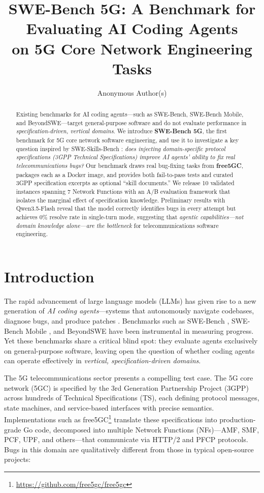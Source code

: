 \documentclass{article}
\title{SWE-Bench 5G: A Benchmark for Evaluating AI Coding Agents \\on 5G Core Network Engineering Tasks}
\author{
  Anonymous Author(s)
}
\begin{document}
\maketitle

\begin{abstract}
Existing benchmarks for AI coding agents---such as SWE-Bench, SWE-Bench Mobile, and BeyondSWE---target general-purpose software and do not evaluate performance in \emph{specification-driven, vertical domains}. We introduce \textbf{SWE-Bench 5G}, the first benchmark for 5G core network software engineering, and use it to investigate a key question inspired by SWE-Skills-Bench \citep{han2025sweskills}: \emph{does injecting domain-specific protocol specifications (3GPP Technical Specifications) improve AI agents' ability to fix real telecommunications bugs?} Our benchmark draws real bug-fixing tasks from \textbf{free5GC}, packages each as a Docker image, and provides both fail-to-pass tests and curated 3GPP specification excerpts as optional ``skill documents.'' We release 10 validated instances spanning 7 Network Functions with an A/B evaluation framework that isolates the marginal effect of specification knowledge. Preliminary results with Qwen3.5-Flash reveal that the model correctly identifies bugs in every attempt but achieves 0\% resolve rate in single-turn mode, suggesting that \emph{agentic capabilities---not domain knowledge alone---are the bottleneck} for telecommunications software engineering.
\end{abstract}

\section{Introduction}

The rapid advancement of large language models (LLMs) has given rise to a new generation of \emph{AI coding agents}---systems that autonomously navigate codebases, diagnose bugs, and produce patches \citep{jimenez2024swebench}. Benchmarks such as SWE-Bench \citep{jimenez2024swebench}, SWE-Bench Mobile \citep{yao2025swebenchmobile}, and BeyondSWE \citep{shi2025beyondswe} have been instrumental in measuring progress. Yet these benchmarks share a critical blind spot: they evaluate agents exclusively on general-purpose software, leaving open the question of whether coding agents can operate effectively in \emph{vertical, specification-driven domains}.

The 5G telecommunications sector presents a compelling test case. The 5G core network (5GC) is specified by the 3rd Generation Partnership Project (3GPP) across hundreds of Technical Specifications (TS), each defining protocol messages, state machines, and service-based interfaces with precise semantics. Implementations such as free5GC\footnote{\url{https://github.com/free5gc/free5gc}} translate these specifications into production-grade Go code, decomposed into multiple Network Functions (NFs)---AMF, SMF, PCF, UPF, and others---that communicate via HTTP/2 and PFCP protocols. Bugs in this domain are qualitatively different from those in typical open-source projects:
\end{document}
